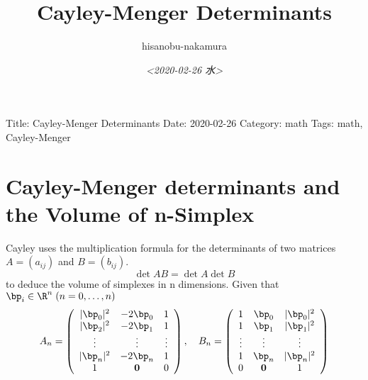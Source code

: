 \documentclass{article}
\author{hisanobu-nakamura}
\date{\textit{<2020-02-26 水>}}
\title{Cayley-Menger Determinants}
\begin{document}
\maketitle
Title: Cayley-Menger Determinants
Date: 2020-02-26
Category: math
Tags: math, Cayley-Menger


\section{Cayley-Menger determinants and the Volume of n-Simplex}
\label{sec-1}
Cayley uses the multiplication formula for the determinants of two matrices $A=(a_{ij})$ and $B=(b_{ij})$.
\begin{equation}
\label{}
\det{AB} = \det{A}\det{B}
\end{equation}
to deduce the volume of simplexes in n dimensions. Given that $\bp_i \in \R^n \; (n=0, \dots,n)$
\begin{equation}
\label{}
A_{n}  =   \left(\begin{array}{ccc}
 |\bp_0 |^2 &  -2\bp_0 & 1 \\
 |\bp_2 |^2 &  -2\bp_1 & 1 \\
 \vdots & \vdots & \vdots \\
 |\bp_n|^2 & -2\bp_n & 1 \\
 1 & \textbf 0 & 0\end{array}\right), \quad
B_n  =  \left(\begin{array}{ccc}
 1 &  \bp_0 & |\bp_0|^2 \\
 1 & \bp_1 & |\bp_1|^2 \\
 \vdots & \vdots & \vdots \\
 1 & \bp_n & |\bp_n|^2 \\ 0 & \textbf 0 & 1\end{array}\right)
\end{equation}
\end{document}
